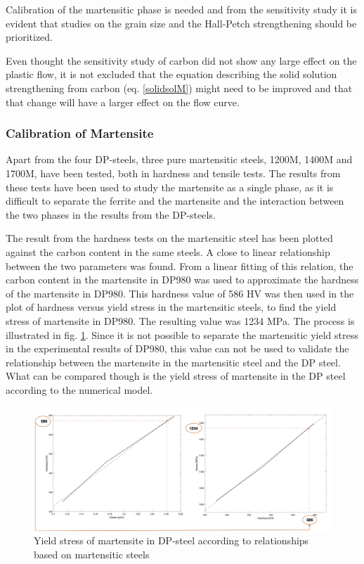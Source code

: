 \documentclass{article}
\begin{document}
Calibration of the martensitic phase is needed and from the sensitivity study it is evident that studies on the grain size and the Hall-Petch strengthening should be prioritized. 

Even thought the sensitivity study of carbon did not show any large effect on the plastic flow, it is not excluded that the equation describing the solid solution strengthening from carbon (eq. \ref{solidsolM}) might need to be improved and that that change will have a larger effect on the flow curve.  

\subsubsection{Calibration of Martensite}
\label{MartensiteCarbon}
Apart from the four DP-steels, three pure martensitic steels, 1200M, 1400M and 1700M, have been tested, both in hardness and tensile tests. The results from these tests have been used to study the martensite as a single phase, as it is difficult to separate the ferrite and the martensite and the interaction between the two phases in the results from the DP-steels.

The result from the hardness tests on the martensitic steel has been plotted against the carbon content in the same steels. A close to linear relationship between the two parameters was found. From a linear fitting of this relation, the carbon content in the martensite in DP980 was used to approximate the hardness of the martensite in DP980. This hardness value of 586 HV was then used in the plot of hardness versus yield stress in the martensitic steels, to find the yield stress of martensite in DP980. The resulting value was 1234 MPa. The process is illustrated in fig. \ref{fig:ValidationMart}. Since it is not possible to separate the martensitic yield stress in the experimental results of DP980, this value can not be used to validate the relationship between the martensite in the martensitic steel and the DP steel. What can be compared though is the yield stress of martensite in the DP steel according to the numerical model. 
\begin{figure}[h!]
    \centering
    \includegraphics[width=\linewidth]{ValidationMart.png}
    \caption{Yield stress of martensite in DP-steel according to relationships based on martensitic steels}
    \label{fig:ValidationMart}
\end{figure}
\end{document}
